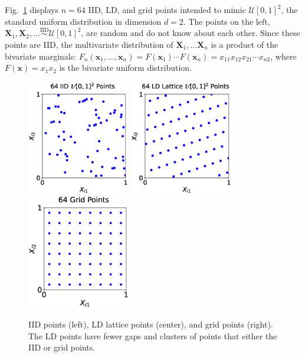 \documentclass[11pt]{NSFamsart}
\newcommand{\bx}{{\boldsymbol{x}}}
\newcommand{\bX}{{\boldsymbol{X}}}
\newcommand{\calu}{{\mathcal{U}}}
\newcommand{\IIDSim}{\overset{\text{IID}}{\sim}}
\begin{document}
Fig.\ \ref{fig:iid_vs_ld} displays $n=64$ IID, LD, and grid points intended to mimic $\calu[0,1]^2$, the standard uniform distribution in dimension $d=2$.  The points on the left, $\bX_1, \bX_2, \ldots \IIDSim \calu[0,1]^2$, are random and do not know about each other.  Since these points are IID, the multivariate distribution of $\bX_1, \ldots \bX_n$ is a product of the bivariate marginals:  $F_{n}(\bx_1, \ldots, \bx_n) = F(\bx_1) 
\cdots F(\bx_n) = x_{11}x_{12} x_{21} \cdots x_{n2}$, where $F(\bx)  = x_1x_2$ is the bivariate uniform distribution.

\begin{figure}[H]
	\centering
	\includegraphics[height = 5cm]{ProgramsImages/iid_scatter.eps} \quad
	\includegraphics[height = 5cm]{ProgramsImages/lattice_scatter.eps} \quad
	\includegraphics[height = 5cm]{ProgramsImages/grid_scatter.eps}
	\caption{IID points (left), LD lattice points (center), and grid points (right).  The LD points have fewer gaps and clusters of points that either the IID or grid points. \label{fig:iid_vs_ld}}
\end{figure}
\end{document}
